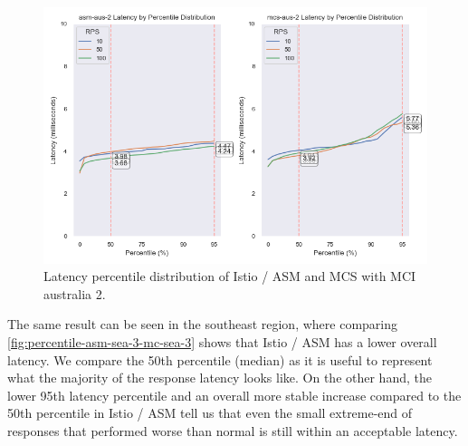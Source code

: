 \begin{figure}
	\centering
	\includegraphics[width=1\textwidth]{assets/plots/percentile-asm-aus-2-mc-aus-2.png}
    \caption{Latency percentile distribution of Istio / ASM and MCS with MCI australia 2.}
	\label{fig:percentile-asm-aus-2-mc-aus-2}
\end{figure}



The same result can be seen in the southeast region, where comparing \autoref{fig:percentile-asm-sea-3-mc-sea-3} shows that Istio / ASM has a lower overall latency. We compare the 50th percentile (median) as it is useful to represent what the majority of the response latency looks like. On the other hand, the lower 95th latency percentile and an overall more stable increase compared to the 50th percentile in Istio / ASM tell us that even the small extreme-end of responses that performed worse than normal is still within an acceptable latency.

